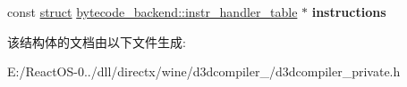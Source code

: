 \begin{DoxyCompactItemize}
\item 
\mbox{\label{structbytecode__backend_a1187cb124e9fa8d959f8a91b359b4817}} 
const \hyperlink{interfacestruct}{struct} \hyperlink{structbytecode__backend_1_1instr__handler__table}{bytecode\+\_\+backend\+::instr\+\_\+handler\+\_\+table} $\ast$ {\bfseries instructions}
\end{DoxyCompactItemize}


该结构体的文档由以下文件生成\+:\begin{DoxyCompactItemize}
\item 
E\+:/\+React\+O\+S-\/0../dll/directx/wine/d3dcompiler\+\_/d3dcompiler\+\_\+private.\+h\end{DoxyCompactItemize}
